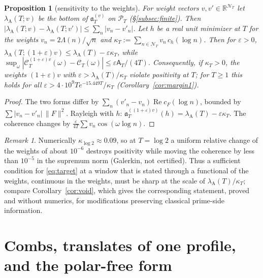 \documentclass[11pt]{amsart}
\newtheorem{proposition}[theorem]{Proposition}
\theoremstyle{definition}
\theoremstyle{remark}
\newtheorem{remark}[theorem]{Remark}
\newcommand{\R}{\mathbb R}
\newcommand{\Rel}{\operatorname{Re}}
\newcommand{\PT}{\mathcal P_T}
\newcommand{\lamA}{\lambda_{\mathrm A}(T)}
\newcommand{\cF}{c_F}
\newcommand{\NT}{\mathcal N_T}
\newcommand{\Aconst}{\mathsf A_T}
\begin{document}
\begin{proposition}[sensitivity to the weights]\label{prop:wit-sens}
For weight vectors $v,v'\in\R^{\NT}$ let $\lambda_{\mathrm A}(T;v)$ be the bottom of $\mathfrak a^{(v)}_T$ on $\PT$
(\S\ref{subsec:finite}). Then $|\lambda_{\mathrm A}(T;v)-\lambda_{\mathrm A}(T;v')|\le\sum_n|v_n-v'_n|$. Let $h$ be a real unit
minimizer at $T$ for the weights $v_n=2\Lambda(n)/\sqrt n$ and $\kappa_T:=\sum_{n\in\NT}v_n\,c_h(\log n)$. Then for
$\varepsilon>0$, $\lambda_{\mathrm A}(T;(1+\varepsilon)v)\le\lamA-\varepsilon\kappa_T$, while
$\sup_\omega|\mathcal C_T^{(1+\varepsilon)v}(\omega)-\mathcal C_T(\omega)|\le\varepsilon\Aconst/(4T)$. Consequently, if $\kappa_T>0$, the
weights $(1+\varepsilon)v$ with $\varepsilon>\lamA/\kappa_T$ violate positivity at $T$; for $T\ge1$ this holds for all
$\varepsilon>4\cdot10^9Te^{-15.449T}/\kappa_T$ (Corollary~\ref{cor:margin1}).
\end{proposition}

\begin{proof}
The two forms differ by $\sum_n(v'_n-v_n)\Rel\cF(\log n)$, bounded by $\sum|v_n-v'_n|\,\|F\|^2$. Rayleigh with $h$:
$\mathfrak a^{((1+\varepsilon)v)}_T(h)=\lamA-\varepsilon\kappa_T$. The coherence changes by $\frac\varepsilon{4T}\sum v_n\cos(\omega\log n)$.
\end{proof}

\begin{remark}\label{rem:wit-sens}
Numerically $\kappa_{\log2}\approx0.09$, so at $T=\log2$ a uniform relative change of the weights of about $10^{-6}$
destroys positivity while moving the coherence by less than $10^{-5}$ in the supremum norm (Galerkin, not certified).
Thus a sufficient condition for \eqref{eq:target} at a window that is stated through a functional of the weights,
continuous in the weights, must be sharp at the scale of $\lamA/\kappa_T$; compare Corollary~\ref{cor:void}, which gives
the corresponding statement, proved and without numerics, for modifications preserving classical prime-side
information.
\end{remark}


\section{Combs, translates of one profile, and the polar-free form}\label{sec:combs}
\end{document}
